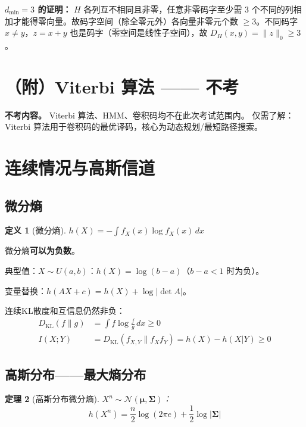 \documentclass[12pt,a4paper]{ctexart}
\newtheorem{theorem}{定理}[section]
\theoremstyle{definition}
\newtheorem{definition}[theorem]{定义}
\newcommand{\DKL}{D_{\mathrm{KL}}}
\begin{document}
\textbf{$d_{\min}=3$ 的证明：} $H$ 各列互不相同且非零，任意非零码字至少需 3 个不同的列相加才能得零向量。故码字空间（除全零元外）各向量非零元个数 $\geq 3$。不同码字 $x \neq y$，$z = x + y$ 也是码字（零空间是线性子空间），故 $D_H(x,y) = \|z\|_0 \geq 3$。

\section*{（附）Viterbi 算法 —— 不考}

\begin{noteskipped}
\textbf{不考内容。} Viterbi 算法、HMM、卷积码均不在此次考试范围内。
仅需了解：Viterbi 算法用于卷积码的最优译码，核心为动态规划/最短路径搜索。
\end{noteskipped}

\section{连续情况与高斯信道}

\subsection{微分熵}

\begin{definition}[微分熵]
$h(X) = -\int f_X(x) \log f_X(x) \,dx$
\end{definition}

微分熵\textbf{可以为负数}。

典型值：$X \sim U(a,b)$：$h(X) = \log(b-a)$（$b-a<1$ 时为负）。

变量替换：$h(AX + c) = h(X) + \log|\det A|$。

连续KL散度和互信息仍然非负：
\begin{align*}
\DKL(f\|g) &= \int f\log\frac{f}{g}\,dx \geq 0 \\
I(X;Y) &= \DKL(f_{X,Y}\|f_X f_Y) = h(X) - h(X|Y) \geq 0
\end{align*}

\subsection{高斯分布——最大熵分布}

\begin{theorem}[高斯分布微分熵]
$X^n \sim \mathcal{N}(\bm{\mu}, \bm{\Sigma})$：
\[
h(X^n) = \frac{n}{2}\log(2\pi e) + \frac{1}{2}\log|\bm{\Sigma}|
\]
\end{theorem}
\end{document}
